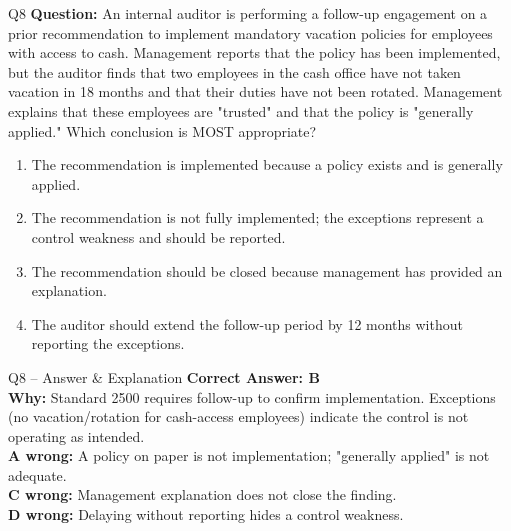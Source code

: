 \documentclass[aspectratio=169,10pt]{beamer}
\begin{document}
	\begin{frame}[t]{Q8}
		\small
		\textbf{Question:} An internal auditor is performing a follow-up engagement on a prior recommendation to implement mandatory vacation policies for employees with access to cash. Management reports that the policy has been implemented, but the auditor finds that two employees in the cash office have not taken vacation in 18 months and that their duties have not been rotated. Management explains that these employees are "trusted" and that the policy is "generally applied." Which conclusion is MOST appropriate?
		\begin{enumerate}[label=\Alph*.,itemsep=1pt,topsep=2pt]
			\item The recommendation is implemented because a policy exists and is generally applied.
			\item The recommendation is not fully implemented; the exceptions represent a control weakness and should be reported.
			\item The recommendation should be closed because management has provided an explanation.
			\item The auditor should extend the follow-up period by 12 months without reporting the exceptions.
		\end{enumerate}
	\end{frame}
	
	\begin{frame}[t]{Q8 -- Answer \& Explanation}
		\small
		\textbf{Correct Answer: B} \\[4pt]
		\textbf{Why:} Standard 2500 requires follow-up to confirm implementation. Exceptions (no vacation/rotation for cash-access employees) indicate the control is not operating as intended. \\[4pt]
		\textbf{A wrong:} A policy on paper is not implementation; "generally applied" is not adequate. \\[2pt]
		\textbf{C wrong:} Management explanation does not close the finding. \\[2pt]
		\textbf{D wrong:} Delaying without reporting hides a control weakness.
	\end{frame}
	
\end{document}
